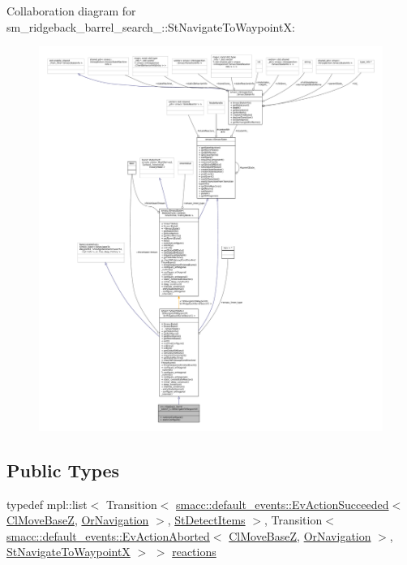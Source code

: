 Collaboration diagram for sm\+\_\+ridgeback\+\_\+barrel\+\_\+search\+\_\+:\+:St\+Navigate\+To\+WaypointX\+:
\nopagebreak
\begin{figure}[H]
\begin{center}
\leavevmode
\includegraphics[width=350pt]{structsm__ridgeback__barrel__search__1_1_1StNavigateToWaypointX__coll__graph}
\end{center}
\end{figure}
\subsection*{Public Types}
\begin{DoxyCompactItemize}
\item 
typedef mpl\+::list$<$ Transition$<$ \hyperlink{structsmacc_1_1default__events_1_1EvActionSucceeded}{smacc\+::default\+\_\+events\+::\+Ev\+Action\+Succeeded}$<$ \hyperlink{classcl__move__base__z_1_1ClMoveBaseZ}{Cl\+Move\+BaseZ}, \hyperlink{classsm__ridgeback__barrel__search__1_1_1OrNavigation}{Or\+Navigation} $>$, \hyperlink{structsm__ridgeback__barrel__search__1_1_1StDetectItems}{St\+Detect\+Items} $>$, Transition$<$ \hyperlink{structsmacc_1_1default__events_1_1EvActionAborted}{smacc\+::default\+\_\+events\+::\+Ev\+Action\+Aborted}$<$ \hyperlink{classcl__move__base__z_1_1ClMoveBaseZ}{Cl\+Move\+BaseZ}, \hyperlink{classsm__ridgeback__barrel__search__1_1_1OrNavigation}{Or\+Navigation} $>$, \hyperlink{structsm__ridgeback__barrel__search__1_1_1StNavigateToWaypointX}{St\+Navigate\+To\+WaypointX} $>$ $>$ \hyperlink{structsm__ridgeback__barrel__search__1_1_1StNavigateToWaypointX_ab19dd0e98bcd2e808a4207413a66ddb5}{reactions}
\end{DoxyCompactItemize}

